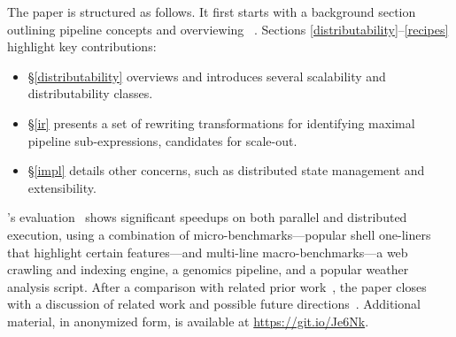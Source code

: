 \documentclass[sigplan,10pt,review,anonymous]{acmart}
\begin{document}

% 
% 
% 

The paper is structured as follows.
It first starts with a background section outlining pipeline concepts and overviewing \sys~.
Sections \ref{distributability}--\ref{recipes} highlight key contributions:
\begin{itemize}

  \item
  \S\ref{distributability} overviews \sys and introduces several scalability and distributability classes.

  \item
  \S\ref{ir} presents a set of rewriting transformations for identifying maximal pipeline sub-expressions, candidates for scale-out.

  \item
  \S\ref{impl} details other concerns, such as distributed state management and extensibility.
\end{itemize}

\noindent
\sys's evaluation~ shows significant speedups on both parallel and distributed execution, using a combination of micro-bench\-marks---popular shell one-liners that highlight certain features---and multi-line macro-benchmarks---a web crawling and indexing engine, a genomics pipeline, and a popular weather analysis script.
After a comparison with related prior work~, the paper closes with a discussion of related work and possible future directions~.
Additional material, in anonymized form, is available at
\href{https://git.io/Je6Nk}{https://git.io/Je6Nk}.
\end{document}
